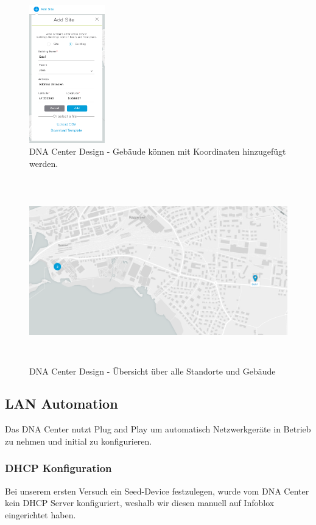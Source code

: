 \begin{figure}[H]
	\centering
	\includegraphics[height=6cm]{img/Selection_014.png}
	\caption{DNA Center Design - Gebäude können mit Koordinaten hinzugefügt werden.}
	\label{fig:dna-center-design-3}
\end{figure}

\begin{figure}[H]
	\centering
	\includegraphics[height=8cm]{img/design_map_overview.PNG}
	\caption{DNA Center Design - Übersicht über alle Standorte und Gebäude}
	\label{fig:dna-center-design-overview}
\end{figure}

\subsection{LAN Automation}
Das DNA Center nutzt Plug and Play um automatisch Netzwerkgeräte in Betrieb zu nehmen und initial zu konfigurieren.
 
\subsubsection{DHCP Konfiguration}
Bei unserem ersten Versuch ein Seed-Device festzulegen, wurde vom DNA Center kein DHCP Server konfiguriert, weshalb wir diesen manuell auf Infoblox eingerichtet haben.\\



